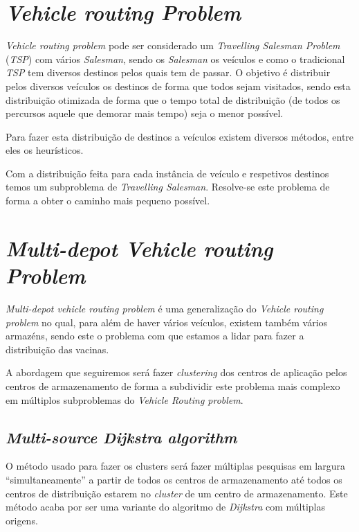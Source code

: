 \documentclass[12pt,a4paper]{report}
\begin{document}
	
	\section{\textit{Vehicle routing Problem}}
	\textit{Vehicle routing problem} pode ser considerado um \textit{Travelling Salesman Problem} (\textit{TSP}) com vários \textit{Salesman}, sendo os \textit{Salesman} os veículos e como o tradicional \textit{TSP} tem diversos destinos pelos quais tem de passar. O objetivo é distribuir pelos diversos veículos os destinos de forma que todos sejam visitados, sendo esta distribuição otimizada de forma que o tempo total de distribuição (de todos os percursos aquele que demorar mais tempo) seja o menor possível. \par
	Para fazer esta distribuição de destinos a veículos existem diversos métodos, entre eles os heurísticos. \par
	Com a distribuição feita para cada instância de veículo e respetivos destinos temos um subproblema de \textit{Travelling Salesman}. Resolve-se este problema de forma a obter o caminho mais pequeno possível.
	
	
	\section{\textit{Multi-depot Vehicle routing Problem}}
	\label{perpetivas:mdvrp}
	\textit{Multi-depot vehicle routing problem} é uma generalização do \textit{Vehicle routing problem} no qual, para além de haver vários veículos, existem também vários armazéns, sendo este o problema com que estamos a lidar para fazer a distribuição das vacinas. \par
	A abordagem que seguiremos será fazer \textit{clustering} dos centros de aplicação pelos centros de armazenamento de forma a subdividir este problema mais complexo em múltiplos subproblemas do \textit{Vehicle Routing problem}. \par
	
		\subsection{\textit{Multi-source Dijkstra algorithm}}
		\label{algo:msdijkstra}
		O método usado para fazer os clusters será fazer múltiplas pesquisas em largura “simultaneamente” a partir de todos os centros de armazenamento até todos os centros de distribuição estarem no \textit{cluster} de um centro de armazenamento. Este método acaba por ser uma variante do algoritmo de \textit{Dijkstra} com múltiplas origens.
\end{document}
